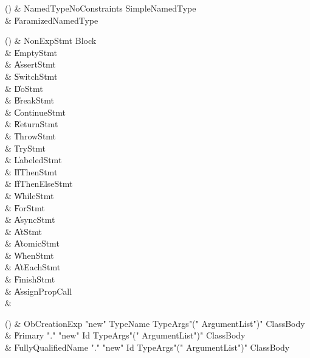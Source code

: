 \begin{bbgrammarappendix}

() & NamedTypeNoConstraints \label{prod:NamedTypeNoConstraints}  \: SimpleNamedType  \\

 &    \| ParamizedNamedType \\

\end{bbgrammarappendix}

\begin{bbgrammarappendix}

() & NonExpStmt \label{prod:NonExpStmt}  \: Block  \\

 &    \| EmptyStmt \\
 &    \| AssertStmt \\
 &    \| SwitchStmt \\
 &    \| DoStmt \\
 &    \| BreakStmt \\
 &    \| ContinueStmt \\
 &    \| ReturnStmt \\
 &    \| ThrowStmt \\
 &    \| TryStmt \\
 &    \| LabeledStmt \\
 &    \| IfThenStmt \\
 &    \| IfThenElseStmt \\
 &    \| WhileStmt \\
 &    \| ForStmt \\
 &    \| AsyncStmt \\
 &    \| AtStmt \\
 &    \| AtomicStmt \\
 &    \| WhenStmt \\
 &    \| AtEachStmt \\
 &    \| FinishStmt \\
 &    \| AssignPropCall \\
 &    \|  \\

\end{bbgrammarappendix}

\begin{bbgrammarappendix}

() & ObCreationExp \label{prod:ObCreationExp}  \: \xcd"new" TypeName TypeArgs\opt \xcd"(" ArgumentList\opt \xcd")" ClassBody\opt  \\

 &    \| Primary \xcd"." \xcd"new" Id TypeArgs\opt \xcd"(" ArgumentList\opt \xcd")" ClassBody\opt \\
 &    \| FullyQualifiedName \xcd"." \xcd"new" Id TypeArgs\opt \xcd"(" ArgumentList\opt \xcd")" ClassBody\opt \\

\end{bbgrammarappendix}

